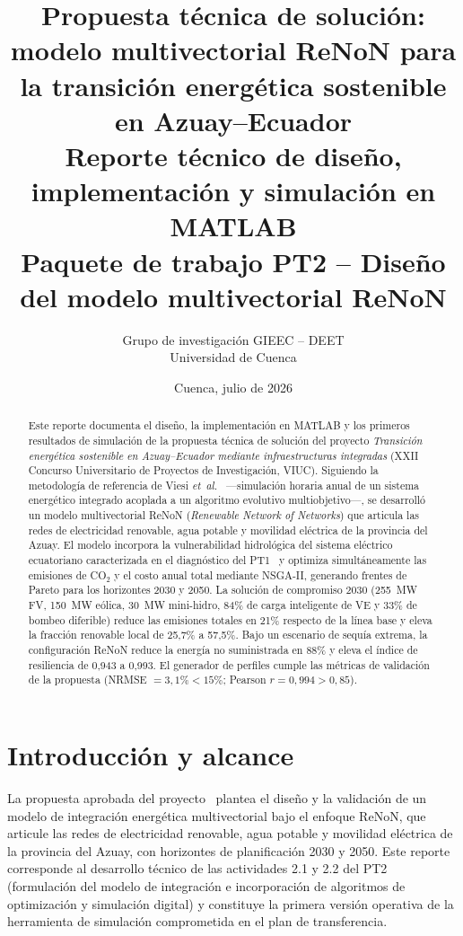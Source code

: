 \documentclass[11pt,a4paper]{article}
\title{\color{UCblue}\textbf{Propuesta t\'ecnica de soluci\'on: modelo multivectorial ReNoN
para la transici\'on energ\'etica sostenible en Azuay--Ecuador}\\[4pt]
\large Reporte t\'ecnico de dise\~no, implementaci\'on y simulaci\'on en MATLAB\\[2pt]
\normalsize Paquete de trabajo PT2 -- Dise\~no del modelo multivectorial ReNoN}
\author{Grupo de investigaci\'on GIEEC -- DEET\\ Universidad de Cuenca}
\date{Cuenca, julio de 2026}
\begin{document}
\maketitle
\thispagestyle{fancy}

\begin{abstract}
\noindent Este reporte documenta el dise\~no, la implementaci\'on en MATLAB y los primeros
resultados de simulaci\'on de la propuesta t\'ecnica de soluci\'on del proyecto
\emph{Transici\'on energ\'etica sostenible en Azuay--Ecuador mediante infraestructuras
integradas} (XXII Concurso Universitario de Proyectos de Investigaci\'on, VIUC).
Siguiendo la metodolog\'ia de referencia de Viesi \emph{et~al.}~\cite{viesi2020}
---simulaci\'on horaria anual de un sistema energ\'etico integrado acoplada a un
algoritmo evolutivo multiobjetivo---, se desarroll\'o un modelo multivectorial ReNoN
(\emph{Renewable Network of Networks}) que articula las redes de electricidad renovable,
agua potable y movilidad el\'ectrica de la provincia del Azuay. El modelo incorpora la
vulnerabilidad hidrol\'ogica del sistema el\'ectrico ecuatoriano caracterizada en el
diagn\'ostico del PT1~\cite{reporte2025} y optimiza simult\'aneamente las emisiones de
CO$_2$ y el costo anual total mediante NSGA-II, generando frentes de Pareto para los
horizontes 2030 y 2050. La soluci\'on de compromiso 2030 (255~MW FV, 150~MW e\'olica,
30~MW mini-hidro, 84\% de carga inteligente de VE y 33\% de bombeo diferible) reduce
las emisiones totales en 21\% respecto de la l\'inea base y eleva la fracci\'on renovable
local de 25,7\% a 57,5\%. Bajo un escenario de sequ\'ia extrema, la configuraci\'on
ReNoN reduce la energ\'ia no suministrada en 88\% y eleva el \'indice de resiliencia de
0,943 a 0,993. El generador de perfiles cumple las m\'etricas de validaci\'on de la
propuesta (NRMSE $=3{,}1\%<15\%$; Pearson $r=0{,}994>0{,}85$).
\end{abstract}

\section{Introducci\'on y alcance}
La propuesta aprobada del proyecto~\cite{formulario2} plantea el dise\~no y la validaci\'on
de un modelo de integraci\'on energ\'etica multivectorial bajo el enfoque ReNoN, que
articule las redes de electricidad renovable, agua potable y movilidad el\'ectrica de la
provincia del Azuay, con horizontes de planificaci\'on 2030 y 2050. Este reporte
corresponde al desarrollo t\'ecnico de las actividades 2.1 y 2.2 del PT2
(formulaci\'on del modelo de integraci\'on e incorporaci\'on de algoritmos de
optimizaci\'on y simulaci\'on digital) y constituye la primera versi\'on operativa de la
herramienta de simulaci\'on comprometida en el plan de transferencia.
\end{document}
